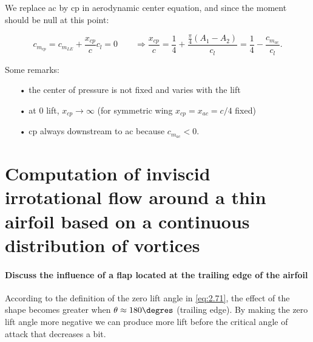 \documentclass[british,french,11pt, a4paper, openany]{article}
\begin{document}
We replace ac by cp in aerodynamic center equation, and since the moment should be null at this point:

\begin{equation}
c_{m_{cp}} = c_{m_{LE}} + \frac{x_{cp}}{c} c_l = 0 \qquad \Rightarrow \frac{x_{cp}}{c} = \frac{1}{4} + \frac{\frac{\pi}{4}(A_1-A_2)}{c_l} = \frac{1}{4} - \frac{c_{m_{ac}}}{c_l}.
\end{equation}

Some remarks: 

\begin{itemize}
	\item[•] the center of pressure is not fixed and varies with the lift
	\item[•] at 0 lift, $x_{cp}\rightarrow \infty$ (for symmetric wing $x_{cp} = x_{ac} = c/4$ fixed)
	\item[•] cp always downstream to ac because $c_{m_{ac}}<0$.
\end{itemize}



\section{Computation of inviscid irrotational flow around a thin airfoil based on a	continuous distribution of vortices}
\paragraph{Discuss the influence of a flap located at the trailing edge of the airfoil}
	According to the definition of the zero lift angle in \eqref{eq:2.71}, the effect of the shape becomes greater when $\theta \approx 180\degres$ (trailing edge). By making the zero lift angle more negative we can produce more lift before the critical angle of attack that decreases a bit.
	
\end{document}
